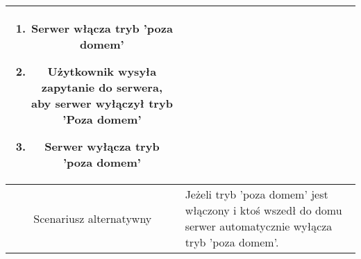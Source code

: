 \documentclass{article}
\begin{document}
\begin{enumerate}
\begin{enumerate}
\begin{table}[H]
\begin{tabular}{|c|p{7cm}|}
\begin{enumerate}
\item Serwer włącza tryb 'poza domem'

\item Użytkownik wysyła zapytanie do serwera, aby serwer wyłączył tryb 'Poza domem'

\item Serwer wyłącza tryb 'poza domem'\end{enumerate} \\
						\hline
						Scenariusz alternatywny & Jeżeli tryb 'poza domem' jest włączony i ktoś wszedł do domu serwer automatycznie wyłącza tryb 'poza domem'.                                                                                                                                                                           \\
						\hline
					\end{tabular}
				\end{table}


\end{enumerate}
\end{enumerate}
\end{document}
